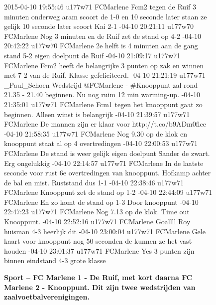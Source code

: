 {{\begin{figure}[H]
 \caption{\bf{Sport} – FC Marlene 1 - De Ruif, met kort daarna FC Marlene 2 - Knooppunt. Dit zijn twee wedstrijden van zaalvoetbalverenigingen.}
\vspace*{-10pt} 
\begin{framed}
\footnotesize{
2015-04-10 19:55:46 u177w71 FCMarlene Fcm2 tegen de Ruif 3 minuten onderweg aram scoort de 1-0 en 10 seconde later staan ze gelijk 10 seconde later scoort Kai 2-1
-04-10 20:21:11 u177w70 FCMarlene Nog 3 minuten en de Ruif zet de stand op 4-2
-04-10 20:42:22 u177w70 FCMarlene 2e helft is 4 minuten aan de gang stand 5-2 eigen doelpunt de Ruif
-04-10 21:09:17 u177w71 FCMarlene Fcm2 heeft de belangrijke 3 punten op zak en winnen met 7-2 van de Ruif. Klasse gefeliciteerd.
-04-10 21:21:19 u177w71 \_Paul\_Schoen Wedstrijd @FCMarlene - \#Knooppunt zal rond 21.35 - 21.40 beginnen. Nu nog ruim 12 min warming-up.
-04-10 21:35:01 u177w71 FCMarlene Fcm1 tegen het knooppunt gaat zo beginnen. Alleen winst is belangrijk
-04-10 21:39:57 u177w71 FCMarlene De mannen zijn er klaar voor http://t.co/b9ADm0fice
-04-10 21:58:35 u177w71 FCMarlene Nog 9.30 op de klok en knooppunt staat al op 4 overtredingen
-04-10 22:00:53 u177w71 FCMarlene De stand is weer gelijk eigen doelpunt Sander de zwart. Erg ongelukkig
-04-10 22:14:57 u177w71 FCMarlene In de laatste seconde voor rust 6e overtredingen van knooppunt. Hofkamp achter de bal en mist. Ruststand dus 1-1
-04-10 22:38:46 u177w71 FCMarlene Knooppunt zet de stand op 1-2
-04-10 22:44:09 u177w71 FCMarlene En zo komt de stand op 1-3 Door knooppunt
-04-10 22:47:23 u177w71 FCMarlene Nog 7.13 op de klok. Time out Knooppunt.
-04-10 22:52:16 u177w71 FCMarlene Goallll Roy huisman 4-3 heerlijk dit
-04-10 23:00:04 u177w71 FCMarlene Gele kaart voor knooppunt nog 50 seconden de kunnen ze het vast houden
-04-10 23:01:37 u177w71 FCMarlene Yes 3 punten zijn binnen eindstand 4-3 grote klasse
}
\end{framed}
\end{figure}

}}
